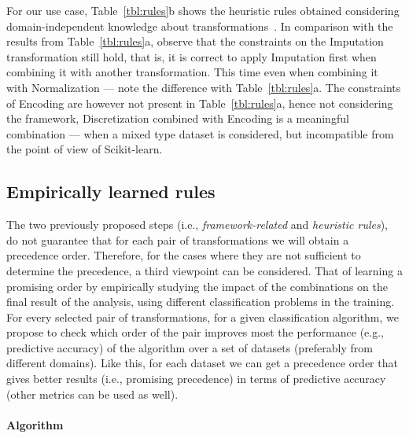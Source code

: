 \begin{example}
For our use case, Table~\ref{tbl:rules}b shows the heuristic rules obtained considering domain-independent knowledge about transformations~\cite{BookExploratoryDM03Dasu}. In comparison with the results from Table~\ref{tbl:rules}a, observe that the constraints on the Imputation transformation still hold, that is, it is correct to apply Imputation first when combining it with another transformation. This time even when combining it with Normalization --- note the difference with Table~\ref{tbl:rules}a. The constraints of Encoding are however not present in Table~\ref{tbl:rules}a, hence not considering the framework, Discretization combined with Encoding is a meaningful combination --- when a mixed type dataset is considered, but incompatible from the point of view of Scikit-learn.
\end{example}

\subsection{Empirically learned rules}
\label{effective-ssec:rules-learned}

The two previously proposed steps (i.e., \textit{framework-related} and \textit{heuristic rules}), do not guarantee that for each pair of transformations we will obtain a precedence order. Therefore, for the cases where they are not sufficient to determine the precedence, a third viewpoint can be considered. That of learning a promising order by empirically studying the impact of the combinations on the final result of the analysis, using different classification problems in the training. For every selected pair of transformations, for a given classification algorithm, we propose to check which order of the pair improves most the performance (e.g., predictive accuracy) of the algorithm over a set of datasets (preferably from different domains). Like this, for each dataset we can get a precedence order that gives better results (i.e., promising precedence) in terms of predictive accuracy (other metrics can be used as well). 

\paragraph{Algorithm}
\label{sec:rules-learned:algorithm}

